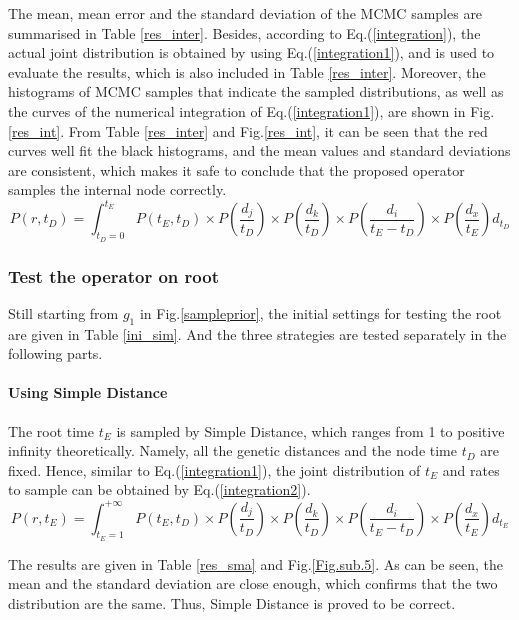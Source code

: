 \documentclass{bmcart}
\begin{document}
The mean, mean error and the standard deviation of the MCMC samples are summarised in Table \ref{res_inter}. Besides, according to Eq.(\ref{integration}), the actual joint distribution is obtained by using Eq.(\ref{integration1}), and is used to evaluate the results, which is also included in Table \ref{res_inter}. Moreover, the histograms of MCMC samples that indicate the sampled distributions, as well as the curves of the numerical integration of Eq.(\ref{integration1}), are shown in Fig.\ref{res_int}. From Table \ref{res_inter} and Fig.\ref{res_int}, it can be seen that the red curves well fit the black histograms, and the mean values and standard deviations are consistent, which makes it safe to conclude that the proposed operator samples the internal node correctly.
\begin{equation}
\label{integration1}
P(r,{t_D}) = \int_{{t_D} = 0}^{{t_E}} {P({t_E},{t_D}) \times P(\frac{{{d_j}}}{{{t_D}}}) \times P(\frac{{{d_k}}}{{{t_D}}}) \times P(\frac{{{d_i}}}{{{t_E} - {t_D}}}) \times P(\frac{{{d_x}}}{{{t_E}}}){d_{t_D}}}
\end{equation}
\subsubsection*{Test the operator on root}
Still starting from $g_1$ in Fig.\ref{sampleprior}, the initial settings for testing the root are given in Table \ref{ini_sim}. And the three strategies are tested separately in the following parts.

\paragraph*{Using Simple Distance}

The root time $t_E$ is sampled by Simple Distance, which ranges from 1 to positive infinity theoretically. Namely, all the genetic distances and the node time $t_D$  are fixed. Hence, similar to Eq.(\ref{integration1}), the joint distribution of $t_E$ and rates to sample can be obtained by Eq.(\ref{integration2}).
\begin{equation}
\label{integration2}
P(r,{t_E}) = \int_{{t_E} = 1}^{ + \infty } {P({t_E},{t_D}) \times P(\frac{{{d_j}}}{{{t_D}}}) \times P(\frac{{{d_k}}}{{{t_D}}}) \times P(\frac{{{d_i}}}{{{t_E} - {t_D}}}) \times P(\frac{{{d_x}}}{{{t_E}}}){d_{t_E}}}
\end{equation}

The results are given in Table \ref{res_sma} and Fig.\ref{Fig.sub.5}. As can be seen, the mean and the standard deviation are close enough, which confirms that the two distribution are the same. Thus, Simple Distance is proved to be correct.
\end{document}
